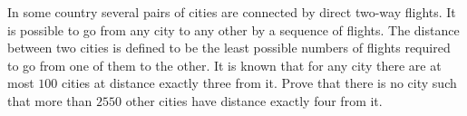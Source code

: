 In some country several pairs of cities are connected by direct two-way flights. It is possible to go from any city to any other by a sequence of flights. The distance between two cities is defined to be the least possible numbers of flights required to go from one of them to the other. It is known that for any city there are at most 
$100$
 cities at distance exactly three from it. Prove that  there is no city such that more than 
$2550$
 other cities have distance exactly four from it.
